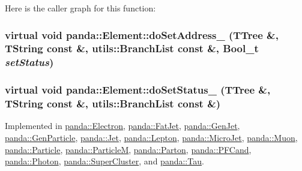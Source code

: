 Here is the caller graph for this function:\hypertarget{classpanda_1_1Element_a7321c2c15b55a8c306567a2ec7bafcff}{
\subsubsection[{doSetAddress\_\-}]{\setlength{\rightskip}{0pt plus 5cm}virtual void panda::Element::doSetAddress\_\- (TTree \&, \/  TString const \&, \/  {\bf utils::BranchList} const \&, \/  Bool\_\-t {\em setStatus})}}
\label{classpanda_1_1Element_a7321c2c15b55a8c306567a2ec7bafcff}
\hypertarget{classpanda_1_1Element_a1309a7039cde6233c19f3c488805015d}{
\subsubsection[{doSetStatus\_\-}]{\setlength{\rightskip}{0pt plus 5cm}virtual void panda::Element::doSetStatus\_\- (TTree \&, \/  TString const \&, \/  {\bf utils::BranchList} const \&)}}
\label{classpanda_1_1Element_a1309a7039cde6233c19f3c488805015d}


Implemented in \hyperlink{classpanda_1_1Electron_af73c3c5f59267c4bba4ceb0a47cfc6ec}{panda::Electron}, \hyperlink{classpanda_1_1FatJet_ad63603b0bd69d4e3b6173a194b3e6829}{panda::FatJet}, \hyperlink{classpanda_1_1GenJet_a519508188c474ac1dcc2c822de9e43c3}{panda::GenJet}, \hyperlink{classpanda_1_1GenParticle_a41d0169feced73ebddb43bf9547cecdf}{panda::GenParticle}, \hyperlink{classpanda_1_1Jet_a494d27c6c2b773f5849996944cf46eb2}{panda::Jet}, \hyperlink{classpanda_1_1Lepton_a2d3b49322244947c933645bbdb44bf88}{panda::Lepton}, \hyperlink{classpanda_1_1MicroJet_ae7b83b860f85cc86b736495317fb7f3a}{panda::MicroJet}, \hyperlink{classpanda_1_1Muon_a5a1c65b72491bc9df325bc182568e40c}{panda::Muon}, \hyperlink{classpanda_1_1Particle_aa30d821beea5e8f3d83580baf162a014}{panda::Particle}, \hyperlink{classpanda_1_1ParticleM_a042f9e295576be022960ea88144e9022}{panda::ParticleM}, \hyperlink{classpanda_1_1Parton_a4471a7ad47570d85d6cd5ffa3c67b4d2}{panda::Parton}, \hyperlink{classpanda_1_1PFCand_a263dcf1e5a9b704827d4b4af006ebcf4}{panda::PFCand}, \hyperlink{classpanda_1_1Photon_a8fbe4f60488cc95024bd4a50b6df6b95}{panda::Photon}, \hyperlink{classpanda_1_1SuperCluster_ac76b8e67d9f4c276c4cf97a563ef5627}{panda::SuperCluster}, and \hyperlink{classpanda_1_1Tau_a96eda4638f1fd6968f3a31757253600e}{panda::Tau}.

